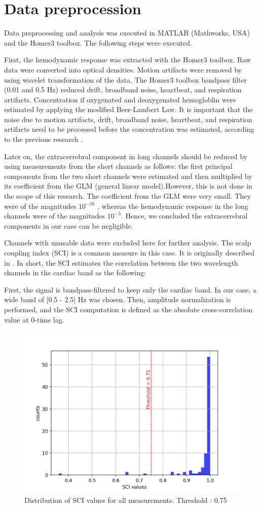 \section {Data preprocession}
Data preprocessing and analysis was executed in MATLAB (Mathworks, USA) and the Homer3 toolbox. The following steps were executed.

First, the hemodynamic response was extracted with the Homer3 toolbox. Raw data were converted into optical densities. Motion artifacts were removed by using wavelet transformation of the data. The Homer3 toolbox bandpass filter (0.01 and 0.5 Hz) reduced drift, broadband noise, heartbeat, and respiration artifacts. Concentration if oxygenated and deoxygenated hemogloblin were estimated by applying the modified Beer-Lambert Law. It is important that the noise due to motion artifacts, drift, broadband noise, heartbeat, and respiration artifacts need to be processed before the concentration was estimated, according to the previous research \cite {Huppert:09}.

Later on, the extracerrebral component in long channels should be reduced by using measurements from the short channels as follows: the first principal components from the two short channels were estimated and then multiplied by its coefficient from the GLM (general linear model).However, this is not done in the scope of this research. The coefficient from the GLM were very small. They were of the magnitudes $10^{-16}$ , whereas the hemodynamic response in the long channels were of the magnitudes $10^{-5}$. Hence, we concluded the extracerrebral components in our case can be negligible.

Channels with unusable data were excluded here for further analysis. The scalp coupling index (SCI) is a common measure in this case. It is originally described in \cite {polloniniSCI}. In short, the SCI estimates the correlation between the two wavelength channels in the cardiac band as the following:

First, the signal is bandpass-filtered to keep only the cardiac band. In our case, a wide band of [0.5 - 2.5] Hz was chosen. Then, amplitude normalization is performed, and the SCI computation is defined as the absolute cross-correlation value at 0-time lag.


\begin{figure}[H]
  \centering
    \includegraphics[scale=.75]{bilder/SCI_hist.png}
  \caption{Distribution of SCI values for all measurements. Threshold : 0.75}
  \label{fig:somesignal}
\end{figure}





